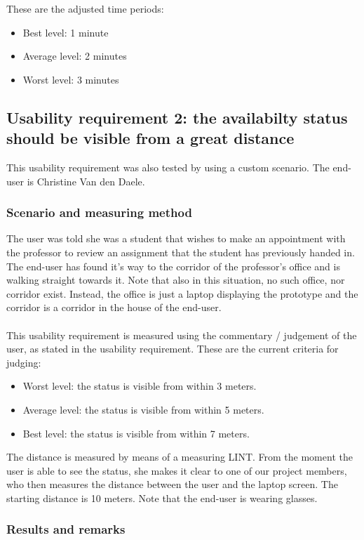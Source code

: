 \documentclass[11pt, a4paper,svglistings]{report}
\begin{document}
These are the adjusted time periods:
\begin{itemize}
\item Best level: 1 minute
\item Average level: 2 minutes
\item Worst level: 3 minutes
\end{itemize}


\subsection{Usability requirement 2: the availabilty status should be visible from a great distance}

This usability requirement was also tested by using a custom scenario. The end-user is Christine Van den Daele.

\subsubsection{Scenario and measuring method}

The user was told she was a student that wishes to make an appointment with the professor to review an assignment that the student has previously handed in. The end-user has found it's way to the corridor of the professor's office and is walking straight towards it. Note that also in this situation, no such office, nor corridor exist. Instead, the office is just a laptop displaying the prototype and the corridor is a corridor in the house of the end-user. \\ \\
This usability requirement is measured using the commentary / judgement of the user, as stated in the usability requirement. These are the current criteria for judging:
\begin{itemize}
\item Worst level: the status is visible from within 3 meters.
\item Average level: the status is visible from within 5 meters.
\item Best level: the status is visible from within 7 meters.
\end{itemize}
The distance is measured by means of a measuring LINT. From the moment the user is able to see the status, she makes it clear to one of our project members, who then measures the distance between the user and the laptop screen. The starting distance is 10 meters. Note that the end-user is wearing glasses.

\subsubsection{Results and remarks}
\end{document}
